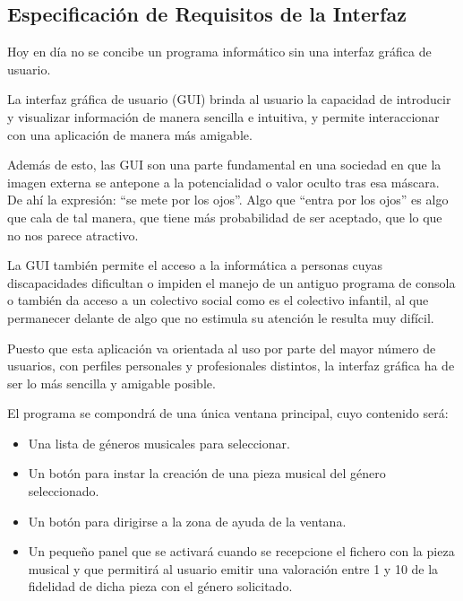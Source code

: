 
\subsection{Especificación de Requisitos de la Interfaz}
\label{especificacion-interfaz}
Hoy en día no se concibe un programa informático sin una interfaz gráfica de usuario.

La interfaz gráfica de usuario (GUI) brinda al usuario la capacidad de introducir y visualizar información de manera sencilla e intuitiva, y permite interaccionar con una aplicación de manera más amigable.

Además de esto, las GUI son una parte fundamental en una sociedad en que la imagen externa se antepone a la potencialidad o valor oculto tras esa máscara. De ahí la expresión: ``se mete por los ojos''. Algo que ``entra por los ojos'' es algo que cala de tal manera, que tiene más probabilidad de ser aceptado, que lo que no nos parece atractivo.

La GUI también permite el acceso a la informática a personas cuyas discapacidades dificultan o impiden el manejo de un antiguo programa de consola o también da acceso a un colectivo social como es el colectivo infantil, al que permanecer delante de algo que no estimula su atención le resulta muy difícil.

Puesto que esta aplicación va orientada al uso por parte del mayor número de usuarios, con perfiles personales y profesionales distintos, la interfaz gráfica ha de ser lo más sencilla y amigable posible.

El programa se compondrá de una única ventana principal, cuyo contenido será:

\begin{itemize}
    \item Una lista de géneros musicales para seleccionar.
    \item Un botón para instar la creación de una pieza musical del género seleccionado.
    \item Un botón para dirigirse a la zona de ayuda de la ventana.
    \item Un pequeño panel que se activará cuando se recepcione el fichero con la pieza musical y que permitirá al usuario emitir una valoración entre 1 y 10 de la fidelidad de dicha pieza con el género solicitado.
\end{itemize}